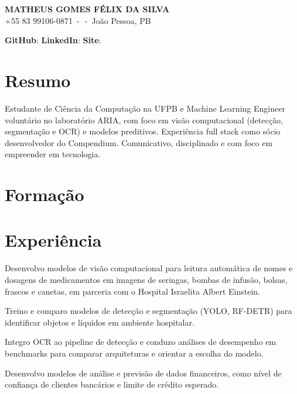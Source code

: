 \documentclass[10pt]{article}
\begin{document}
\begin{center}
  {\LARGE\bfseries MATHEUS GOMES FÉLIX DA SILVA}\\[5pt]
  +55 83 99106-0871 \,-\,  \,-\, João Pessoa, PB
\end{center}
\vspace{2pt}

\textbf{GitHub}:  \quad
\textbf{LinkedIn}:  \quad
\textbf{Site}: 

\section{Resumo}
Estudante de Ciência da Computação na UFPB e Machine Learning Engineer voluntário no laboratório ARIA, com foco em visão computacional (detecção, segmentação e OCR) e modelos preditivos. Experiência full stack como sócio desenvolvedor do Compendium. Comunicativo, disciplinado e com foco em empreender em tecnologia.

\section{Formação}

\section{Experiência}
\begin{itens}
  \item Desenvolvo modelos de visão computacional para leitura automática de nomes e dosagens de medicamentos em imagens de seringas, bombas de infusão, bolsas, frascos e canetas, em parceria com o Hospital Israelita Albert Einstein.
  \item Treino e comparo modelos de detecção e segmentação (YOLO, RF-DETR) para identificar objetos e líquidos em ambiente hospitalar.
  \item Integro OCR ao pipeline de detecção e conduzo análises de desempenho em benchmarks para comparar arquiteturas e orientar a escolha do modelo.
  \item Desenvolvo modelos de análise e previsão de dados financeiros, como nível de confiança de clientes bancários e limite de crédito esperado.
\end{itens}
\end{document}
